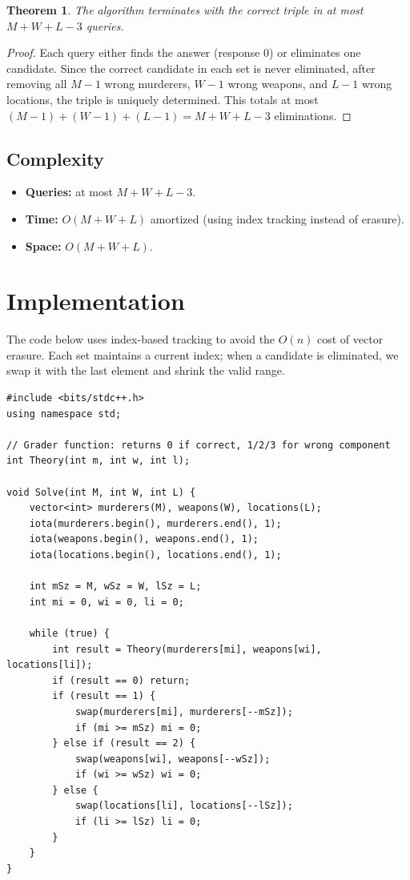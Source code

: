 \documentclass[11pt,a4paper]{article}
\newtheorem{theorem}{Theorem}
\begin{document}
\begin{theorem}
The algorithm terminates with the correct triple in at most $M + W + L - 3$ queries.
\end{theorem}
\begin{proof}
Each query either finds the answer (response $0$) or eliminates one candidate. Since the correct candidate in each set is never eliminated, after removing all $M - 1$ wrong murderers, $W - 1$ wrong weapons, and $L - 1$ wrong locations, the triple is uniquely determined. This totals at most $(M-1) + (W-1) + (L-1) = M + W + L - 3$ eliminations.
\end{proof}

\subsection{Complexity}
\begin{itemize}
    \item \textbf{Queries:} at most $M + W + L - 3$.
    \item \textbf{Time:} $O(M + W + L)$ amortized (using index tracking instead of erasure).
    \item \textbf{Space:} $O(M + W + L)$.
\end{itemize}

\section{Implementation}
The code below uses index-based tracking to avoid the $O(n)$ cost of vector erasure. Each set maintains a current index; when a candidate is eliminated, we swap it with the last element and shrink the valid range.

\begin{lstlisting}
#include <bits/stdc++.h>
using namespace std;

// Grader function: returns 0 if correct, 1/2/3 for wrong component
int Theory(int m, int w, int l);

void Solve(int M, int W, int L) {
    vector<int> murderers(M), weapons(W), locations(L);
    iota(murderers.begin(), murderers.end(), 1);
    iota(weapons.begin(), weapons.end(), 1);
    iota(locations.begin(), locations.end(), 1);

    int mSz = M, wSz = W, lSz = L;
    int mi = 0, wi = 0, li = 0;

    while (true) {
        int result = Theory(murderers[mi], weapons[wi], locations[li]);
        if (result == 0) return;
        if (result == 1) {
            swap(murderers[mi], murderers[--mSz]);
            if (mi >= mSz) mi = 0;
        } else if (result == 2) {
            swap(weapons[wi], weapons[--wSz]);
            if (wi >= wSz) wi = 0;
        } else {
            swap(locations[li], locations[--lSz]);
            if (li >= lSz) li = 0;
        }
    }
}
\end{lstlisting}
\end{document}
